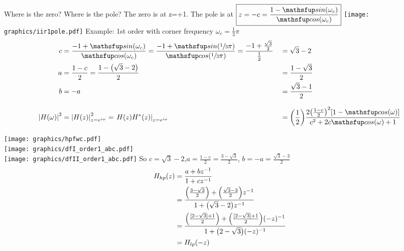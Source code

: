 \newpage
Where is the zero? Where is the pole?
\vfill
The zero is at z=+1. \qquad The pole is at 
$\ds\boxed{z=-c = \frac{1 - \sin\brp{\omega_c}}
                    {\cos\brp{\omega_c}}}$
\vfill
\texttt{[image: graphics/iir1pole.pdf]}
\vfill\mbox{}
\newpage
Example: 1st order  with corner frequency $\omega_c=\frac{1}{3}\pi$
\vfill
{\LARGE\begin{align*}
  c &= \frac{-1 + \sin\brp{\omega_c}}{\cos\brp{\omega_c}}
     = \frac{-1 + \sin\brp{\sfrac{1}{3}\pi}}{\cos\brp{\sfrac{1}{3}\pi}}
     = \frac{-1 + \frac{\sqrt{3}}{2}}{\frac{1}{2}}
   &&= \sqrt{3} - 2
  \\
  a &= \frac{1-c}{2}
     = \frac{1-\brp{\sqrt{3} - 2}}{2}
   &&= \frac{1-\sqrt{3}}{2}
  \\
  b &= -a
   &&= \frac{\sqrt{3} - 1}{2}
  \\
  \\
  \abs{H(\omega)}^2
    &= \abs{H(z)}^2_{z=e^{i\omega}}
     = \brlr{H(z)H^\ast(z)}_{z=e^{i\omega}}
   &&= \brp{\frac{1}{2}}\frac{2\brp{\frac{1-c}{2}}^2\brs{1 -  \cos\brp{\omega}}}
            {c^2 + 2 c\cos\brp{\omega} + 1}
\end{align*}}

\vfill\newpage
\texttt{[image: graphics/hpfwc.pdf]}\\
\texttt{[image: graphics/dfI\_order1\_abc.pdf]}\\
\texttt{[image: graphics/dfII\_order1\_abc.pdf]}
\vfill\mbox{}
\newpage
\vfill
So $c=\sqrt{3}-2$,\qquad $a=\frac{1-c}{2}=\frac{3-\sqrt{3}}{2}$, \qquad $b=-a=\frac{\sqrt{3}-3}{2}$
\begin{align*}
  H_{hp}(z)
    &= \frac{a + bz^{-1}}{1+cz^{-1}}
  \\&= \frac{{\left(\frac{3-\sqrt{3}}{2}\right)} + {\left(\frac{\sqrt{3}-3}{2}\right)}z^{-1}}
            {1+{\left(\sqrt{3}-2\right)}z^{-1}}
  \\&= \frac{{\left(\frac{[2-\sqrt{3}]+1}{2}\right)} + {\left(\frac{[2-\sqrt{3}]+1}{2}\right)}(-z)^{-1}}
            {1+{\left(2-\sqrt{3}\right)}(-z)^{-1}}
  \\&= H_{lp}(-z)
\end{align*}

\mbox{}\vfill
\newpage
